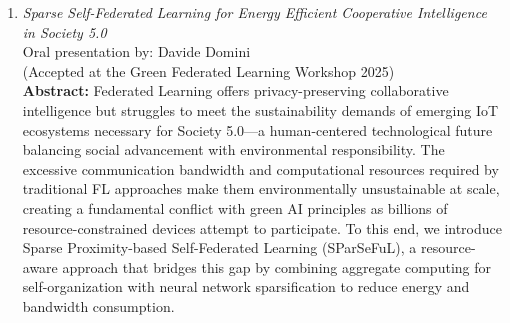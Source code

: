 \documentclass[runningheads]{llncs}
\begin{document}
\begin{enumerate}
    \item \emph{Sparse Self-Federated Learning for Energy Efficient Cooperative Intelligence in Society 5.0}~\cite{DBLP:journals/corr/abs-2507-07613}  \\ Oral presentation by: Davide Domini 
     \\ (Accepted at the Green Federated Learning Workshop 2025) \\
    \textbf{Abstract: }
    Federated Learning offers privacy-preserving collaborative intelligence but struggles to meet the sustainability demands 
     of emerging IoT ecosystems necessary for Society 5.0---a human-centered technological future balancing social advancement 
     with environmental responsibility. 
    The excessive communication bandwidth and computational resources required by traditional FL approaches make them 
     environmentally unsustainable at scale, creating a fundamental conflict with green AI principles as billions 
     of resource-constrained devices attempt to participate. 
    To this end, we introduce Sparse Proximity-based Self-Federated Learning (SParSeFuL), 
     a resource-aware approach that bridges this gap by combining aggregate computing for self-organization with neural network 
     sparsification to reduce energy and bandwidth consumption.
     

\end{enumerate}
\end{document}
